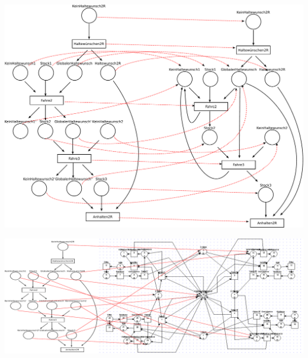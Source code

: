 \documentclass{scrreprt}
\begin{document}
\begin{enumerate}
\includegraphics[width=1\textwidth]{prozess-morph.pdf}

\newpage

\includegraphics[width=1\textwidth]{netzmorph.pdf}

\end{enumerate}
\end{document}
